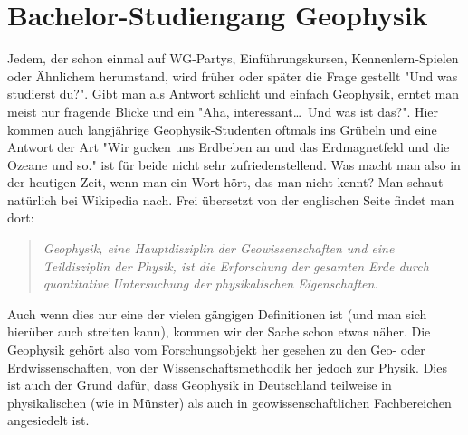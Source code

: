 \section{Bachelor-Studiengang Geophysik}
\begin{multicols}{2}
Jedem, der schon einmal auf WG-Partys, Einführungskursen, Kennenlern-Spielen oder Ähnlichem herumstand, wird früher oder später die Frage gestellt "Und was studierst du?".
Gibt man als Antwort schlicht und einfach Geophysik, erntet man meist nur fragende Blicke und ein "Aha, interessant\dots\ Und was ist das?".
Hier kommen auch langjährige Geophysik-Studenten oftmals ins Grübeln und eine Antwort der Art "Wir gucken uns Erdbeben an und das Erdmagnetfeld und die Ozeane und so." ist für beide nicht sehr zufriedenstellend.
Was macht man also in der heutigen Zeit, wenn man ein Wort hört, das man nicht kennt? Man schaut natürlich bei Wikipedia nach.
Frei übersetzt von der englischen Seite findet man dort:
\begin{quote}
	\textit{Geophysik, eine Hauptdisziplin der Geowissenschaften und eine Teildisziplin der Physik, ist die Erforschung der gesamten Erde durch quantitative Untersuchung der physikalischen Eigenschaften.}
\end{quote}

Auch wenn dies nur eine der vielen gängigen Definitionen ist (und man sich hierüber auch streiten kann), kommen wir der Sache schon etwas näher.
Die Geophysik gehört also vom Forschungsobjekt her gesehen zu den Geo- oder Erdwissenschaften, von der Wissenschaftsmethodik her jedoch zur Physik.
Dies ist auch der Grund dafür, dass Geophysik in Deutschland teilweise in physikalischen (wie in Münster) als auch in geowissenschaftlichen Fachbereichen angesiedelt ist.


\end{multicols}
